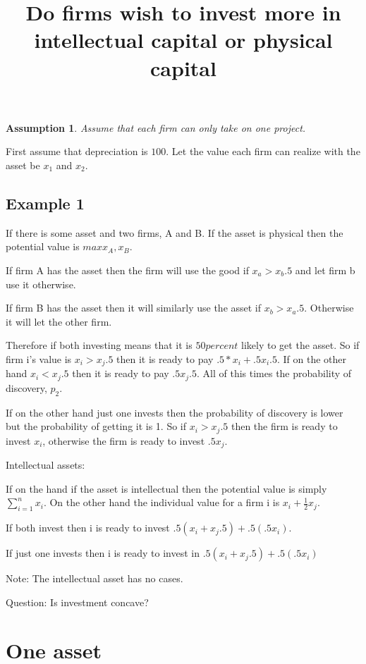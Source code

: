 \documentclass{article}
\newtheorem{assumption}{Assumption}
\begin{document}
\title{Do firms wish to invest more in intellectual capital or physical capital}

\begin{assumption}
Assume that each firm can only take on one project. 
\end{assumption}

First assume that depreciation is $ 100$. Let the value each firm can realize with the asset be $x_1$ and $x_2$. 

\section{Example 1}

If there is some asset and two firms, A and B. If the asset is physical then the potential value is $ max{x_A,x_B}$. 

If firm A has the asset then the firm will use the good if $x_a>x_b.5$ and let firm b use it otherwise. 

If firm B has the asset then it will similarly use the asset if $ x_b>x_a.5 $. Otherwise it will let the other firm. 

Therefore if both investing means that it is $ 50 per cent$ likely to get the asset. So if firm i's value is $x_i>x_j.5$ then it is ready to pay $.5*x_i+.5 x_i .5$. If on the other hand $x_i<x_j.5$ then it is ready to pay $.5{x_j}.5$. All of this times the probability of discovery, $p_2$.

If on the other hand just one invests then the probability of discovery is lower but the probability of getting it is 1. So if $x_i>x_j.5$ then the firm is ready to invest $x_i$, otherwise the firm is ready to invest $.5 x_j$. 

Intellectual assets: 

If on the hand if the asset is intellectual then the potential value is simply $\sum^n_{i=1}x_i$. On the other hand the individual value for a firm i is $x_i+\frac{1}{2}x_j$. 

If both invest then i is ready to invest $.5(x_i+x_j.5)+.5(.5x_i)$. 

If just one invests then i is ready to invest in $.5(x_i+x_j.5)+.5(.5x_i)$

Note:
The intellectual asset has no cases. 

Question: Is investment concave? 

\chapter*{One asset}
\end{document}
